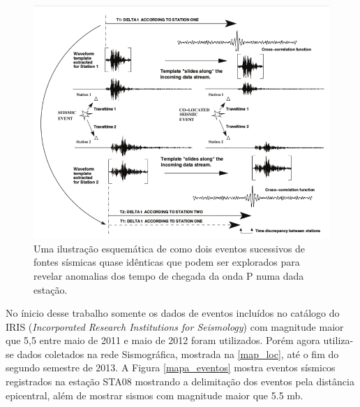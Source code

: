 \begin{figure}[!ht]
\centering
\includegraphics[scale=0.6]{correlacao_tempo_de_chegada.png}
\caption{Uma ilustração esquemática de como dois eventos sucessivos de fontes sísmicas quase idênticas que podem ser explorados para revelar anomalias dos tempo de chegada da onda P numa dada estação. \citep{gibbons_identification_2006}}
\label{teste_tempo}
\end{figure}

No ínicio desse trabalho somente os dados de eventos incluídos no catálogo do IRIS (\textit{Incorporated Research Institutions for Seismology}) com magnitude maior que 5,5 entre maio de 2011 e maio de 2012 foram utilizados. Porém agora utiliza-se dados coletados na rede Sismográfica, mostrada na \ref{map_loc}, até o fim do segundo semestre de 2013. A Figura \ref{mapa_eventos} mostra eventos sísmicos registrados na estação STA08 mostrando a delimitação dos eventos pela distância epicentral, além de mostrar sismos com magnitude maior que 5.5 mb.

